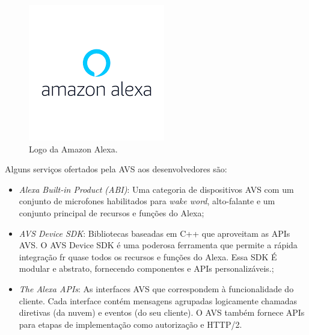 \documentclass[
    12pt,
    openright,
    twoside,
    a4paper,
    english,
    spanish,
    brazil,
    ]{abntex2}
\begin{document}
\begin{figure}[htb]
	\label{fig_logo_alexa}
	\caption{Logo da Amazon Alexa.}
	\begin{center}
		\includegraphics[scale=0.7]{Images/logo_amazon_alexa.png}
	\end{center}
\end{figure}

Alguns serviços ofertados pela AVS aos desenvolvedores são:
\begin{itemize}
	\item \textit{Alexa Built-in Product (ABI)}: Uma categoria de dispositivos AVS com um conjunto de microfones habilitados para \textit{wake word}, alto-falante e um conjunto principal de recursos e funções do Alexa;
	\item \textit{AVS Device SDK}: Bibliotecas baseadas em C++ que aproveitam as APIs AVS. O AVS Device SDK é uma poderosa ferramenta que permite a rápida integração fr quase todos os recursos e funções do Alexa. Essa SDK É modular e abstrato, fornecendo componentes e APIs personalizáveis.;
	\item \textit{The Alexa APIs}: As interfaces AVS que correspondem à funcionalidade do cliente. Cada interface contém mensagens agrupadas logicamente chamadas diretivas (da nuvem) e eventos (do seu cliente). O AVS também fornece APIs para etapas de implementação como autorização e HTTP/2.
\end{itemize}
\end{document}
